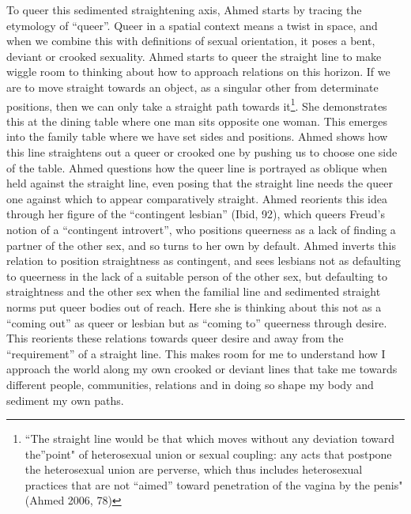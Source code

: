 To queer this sedimented straightening axis, Ahmed starts by tracing the
etymology of ``queer''. Queer in a spatial context means a twist in
space, and when we combine this with definitions of sexual orientation,
it poses a bent, deviant or crooked sexuality. Ahmed starts to queer the
straight line to make wiggle room to thinking about how to approach
relations on this horizon. If we are to move straight towards an object,
as a singular other from determinate positions, then we can only take a
straight path towards it\footnote{``The straight line would be that
  which moves without any deviation toward the''point" of heterosexual
  union or sexual coupling: any acts that postpone the heterosexual
  union are perverse, which thus includes heterosexual practices that
  are not ``aimed'' toward penetration of the vagina by the penis"(Ahmed
  2006, 78)}. She demonstrates this at the dining table where one man
sits opposite one woman. This emerges into the family table where we
have set sides and positions. Ahmed shows how this line straightens out
a queer or crooked one by pushing us to choose one side of the table.
Ahmed questions how the queer line is portrayed as oblique when held
against the straight line, even posing that the straight line needs the
queer one against which to appear comparatively straight. Ahmed
reorients this idea through her figure of the ``contingent lesbian''
(Ibid, 92), which queers Freud's notion of a ``contingent introvert'',
who positions queerness as a lack of finding a partner of the other sex,
and so turns to her own by default. Ahmed inverts this relation to
position straightness as contingent, and sees lesbians not as defaulting
to queerness in the lack of a suitable person of the other sex, but
defaulting to straightness and the other sex when the familial line and
sedimented straight norms put queer bodies out of reach. Here she is
thinking about this not as a ``coming out'' as queer or lesbian but as
``coming to'' queerness through desire. This reorients these relations
towards queer desire and away from the ``requirement'' of a straight
line. This makes room for me to understand how I approach the world
along my own crooked or deviant lines that take me towards different
people, communities, relations and in doing so shape my body and
sediment my own paths.

